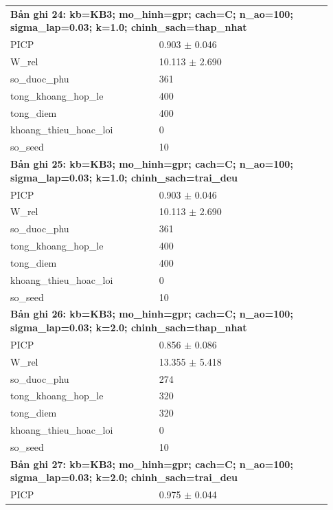 \begin{longtable}{p{0.43\linewidth}p{0.50\linewidth}}
\midrule
\multicolumn{2}{p{0.95\linewidth}}{\textbf{Bản ghi 24: kb=KB3; mo\_hinh=gpr; cach=C; n\_ao=100; sigma\_lap=0.03; k=1.0; chinh\_sach=thap\_nhat}} \\
PICP & 0.903 $\pm$ 0.046 \\
W\_\allowbreak rel & 10.113 $\pm$ 2.690 \\
so\_\allowbreak duoc\_\allowbreak phu & 361 \\
tong\_\allowbreak khoang\_\allowbreak hop\_\allowbreak le & 400 \\
tong\_\allowbreak diem & 400 \\
khoang\_\allowbreak thieu\_\allowbreak hoac\_\allowbreak loi & 0 \\
so\_\allowbreak seed & 10 \\
\midrule
\multicolumn{2}{p{0.95\linewidth}}{\textbf{Bản ghi 25: kb=KB3; mo\_hinh=gpr; cach=C; n\_ao=100; sigma\_lap=0.03; k=1.0; chinh\_sach=trai\_deu}} \\
PICP & 0.903 $\pm$ 0.046 \\
W\_\allowbreak rel & 10.113 $\pm$ 2.690 \\
so\_\allowbreak duoc\_\allowbreak phu & 361 \\
tong\_\allowbreak khoang\_\allowbreak hop\_\allowbreak le & 400 \\
tong\_\allowbreak diem & 400 \\
khoang\_\allowbreak thieu\_\allowbreak hoac\_\allowbreak loi & 0 \\
so\_\allowbreak seed & 10 \\
\midrule
\multicolumn{2}{p{0.95\linewidth}}{\textbf{Bản ghi 26: kb=KB3; mo\_hinh=gpr; cach=C; n\_ao=100; sigma\_lap=0.03; k=2.0; chinh\_sach=thap\_nhat}} \\
PICP & 0.856 $\pm$ 0.086 \\
W\_\allowbreak rel & 13.355 $\pm$ 5.418 \\
so\_\allowbreak duoc\_\allowbreak phu & 274 \\
tong\_\allowbreak khoang\_\allowbreak hop\_\allowbreak le & 320 \\
tong\_\allowbreak diem & 320 \\
khoang\_\allowbreak thieu\_\allowbreak hoac\_\allowbreak loi & 0 \\
so\_\allowbreak seed & 10 \\
\midrule
\multicolumn{2}{p{0.95\linewidth}}{\textbf{Bản ghi 27: kb=KB3; mo\_hinh=gpr; cach=C; n\_ao=100; sigma\_lap=0.03; k=2.0; chinh\_sach=trai\_deu}} \\
PICP & 0.975 $\pm$ 0.044 \\

\end{longtable}
